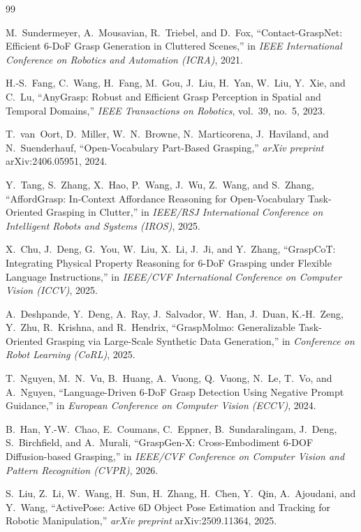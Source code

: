\documentclass[11pt,a4paper]{article}
\begin{document}
\begin{thebibliography}{99}

M.~Sundermeyer, A.~Mousavian, R.~Triebel, and D.~Fox,
``Contact-GraspNet: Efficient 6-DoF Grasp Generation in Cluttered Scenes,''
in \emph{IEEE International Conference on Robotics and Automation (ICRA)}, 2021.

H.-S.~Fang, C.~Wang, H.~Fang, M.~Gou, J.~Liu, H.~Yan, W.~Liu, Y.~Xie, and C.~Lu,
``AnyGrasp: Robust and Efficient Grasp Perception in Spatial and Temporal Domains,''
\emph{IEEE Transactions on Robotics}, vol.~39, no.~5, 2023.

T.~van~Oort, D.~Miller, W.~N.~Browne, N.~Marticorena, J.~Haviland, and N.~Suenderhauf,
``Open-Vocabulary Part-Based Grasping,''
\emph{arXiv preprint} arXiv:2406.05951, 2024.

Y.~Tang, S.~Zhang, X.~Hao, P.~Wang, J.~Wu, Z.~Wang, and S.~Zhang,
``AffordGrasp: In-Context Affordance Reasoning for Open-Vocabulary Task-Oriented Grasping in Clutter,''
in \emph{IEEE/RSJ International Conference on Intelligent Robots and Systems (IROS)}, 2025.

X.~Chu, J.~Deng, G.~You, W.~Liu, X.~Li, J.~Ji, and Y.~Zhang,
``GraspCoT: Integrating Physical Property Reasoning for 6-DoF Grasping under Flexible Language Instructions,''
in \emph{IEEE/CVF International Conference on Computer Vision (ICCV)}, 2025.

A.~Deshpande, Y.~Deng, A.~Ray, J.~Salvador, W.~Han, J.~Duan, K.-H.~Zeng, Y.~Zhu, R.~Krishna, and R.~Hendrix,
``GraspMolmo: Generalizable Task-Oriented Grasping via Large-Scale Synthetic Data Generation,''
in \emph{Conference on Robot Learning (CoRL)}, 2025.

T.~Nguyen, M.~N.~Vu, B.~Huang, A.~Vuong, Q.~Vuong, N.~Le, T.~Vo, and A.~Nguyen,
``Language-Driven 6-DoF Grasp Detection Using Negative Prompt Guidance,''
in \emph{European Conference on Computer Vision (ECCV)}, 2024.

B.~Han, Y.-W.~Chao, E.~Coumans, C.~Eppner, B.~Sundaralingam, J.~Deng, S.~Birchfield, and A.~Murali,
``GraspGen-X: Cross-Embodiment 6-DOF Diffusion-based Grasping,''
in \emph{IEEE/CVF Conference on Computer Vision and Pattern Recognition (CVPR)}, 2026.

S.~Liu, Z.~Li, W.~Wang, H.~Sun, H.~Zhang, H.~Chen, Y.~Qin, A.~Ajoudani, and Y.~Wang,
``ActivePose: Active 6D Object Pose Estimation and Tracking for Robotic Manipulation,''
\emph{arXiv preprint} arXiv:2509.11364, 2025.


\end{thebibliography}
\end{document}
